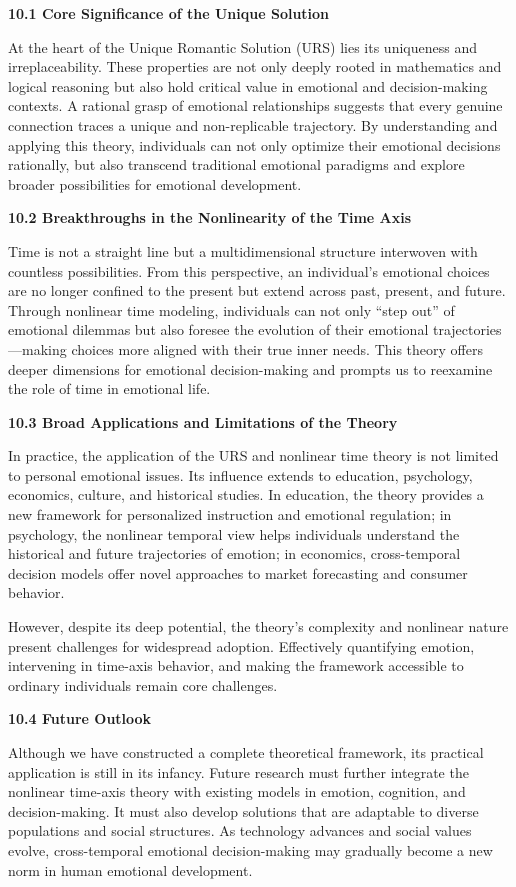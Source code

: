 \documentclass[
]{article}
\begin{document}
\textbf{10.1 Core Significance of the Unique Solution}

At the heart of the Unique Romantic Solution (URS) lies its uniqueness
and irreplaceability. These properties are not only deeply rooted in
mathematics and logical reasoning but also hold critical value in
emotional and decision-making contexts. A rational grasp of emotional
relationships suggests that every genuine connection traces a unique and
non-replicable trajectory. By understanding and applying this theory,
individuals can not only optimize their emotional decisions rationally,
but also transcend traditional emotional paradigms and explore broader
possibilities for emotional development.

\textbf{10.2 Breakthroughs in the Nonlinearity of the Time Axis}

Time is not a straight line but a multidimensional structure interwoven
with countless possibilities. From this perspective, an individual's
emotional choices are no longer confined to the present but extend
across past, present, and future. Through nonlinear time modeling,
individuals can not only ``step out'' of emotional dilemmas but also
foresee the evolution of their emotional trajectories---making choices
more aligned with their true inner needs. This theory offers deeper
dimensions for emotional decision-making and prompts us to reexamine the
role of time in emotional life.

\textbf{10.3 Broad Applications and Limitations of the Theory}

In practice, the application of the URS and nonlinear time theory is not
limited to personal emotional issues. Its influence extends to
education, psychology, economics, culture, and historical studies. In
education, the theory provides a new framework for personalized
instruction and emotional regulation; in psychology, the nonlinear
temporal view helps individuals understand the historical and future
trajectories of emotion; in economics, cross-temporal decision models
offer novel approaches to market forecasting and consumer behavior.

However, despite its deep potential, the theory's complexity and
nonlinear nature present challenges for widespread adoption. Effectively
quantifying emotion, intervening in time-axis behavior, and making the
framework accessible to ordinary individuals remain core challenges.

\textbf{10.4 Future Outlook}

Although we have constructed a complete theoretical framework, its
practical application is still in its infancy. Future research must
further integrate the nonlinear time-axis theory with existing models in
emotion, cognition, and decision-making. It must also develop solutions
that are adaptable to diverse populations and social structures. As
technology advances and social values evolve, cross-temporal emotional
decision-making may gradually become a new norm in human emotional
development.
\end{document}
